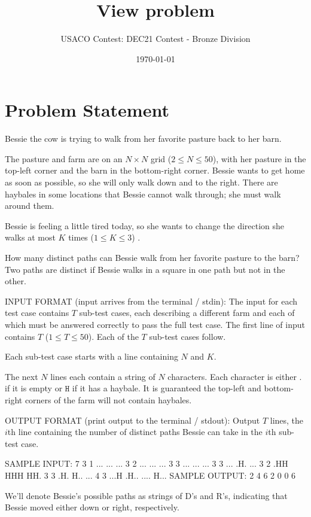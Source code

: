 \documentclass[12pt]{article}
\title{View problem}
\author{USACO Contest: DEC21 Contest - Bronze Division}
\date{\today}
\begin{document}
\maketitle

\section*{Problem Statement}

Bessie the cow is trying to walk from her favorite pasture back to her barn.

The pasture and farm are on an $N \times N$ grid ($2 \leq N \leq 50$), with her
pasture in the top-left corner and the barn in the bottom-right corner. Bessie
wants to get home as soon as possible, so she will only walk down and to the
right. There are haybales in some locations that Bessie cannot walk through; she
must walk around them.

Bessie is feeling a little tired today, so she wants to change the direction she
walks at most $K$ times ($1 \leq K \leq 3$) .

How many distinct paths can Bessie walk from her favorite pasture to the barn?
Two paths are distinct if Bessie walks in a square in one path but not in the
other.

INPUT FORMAT (input arrives from the terminal / stdin):
The input for each test case contains $T$ sub-test cases, each describing a
different farm and each of which must be  answered correctly to pass the full
test case.  The first line of input  contains $T$ ($1 \leq T \leq 50$).  Each of
the $T$ sub-test cases follow.

Each sub-test case starts with a line containing $N$ and $K$. 

The next $N$ lines each contain a string of $N$ characters. Each character is
either $\texttt{.}$ if it is empty or $\texttt{H}$ if it has a haybale. It is
guaranteed the top-left and bottom-right corners of the farm will not contain
haybales.

OUTPUT FORMAT (print output to the terminal / stdout):
Output $T$ lines, the $i$th line containing the number of distinct paths Bessie
can take in the $i$th sub-test case.

SAMPLE INPUT:
7
3 1
...
...
...
3 2
...
...
...
3 3
...
...
...
3 3
...
.H.
...
3 2
.HH
HHH
HH.
3 3
.H.
H..
...
4 3
...H
.H..
....
H...
SAMPLE OUTPUT: 
2
4
6
2
0
0
6

We'll denote Bessie's possible paths as strings of D's and R's, indicating that
Bessie moved either down or right, respectively.
\end{document}
